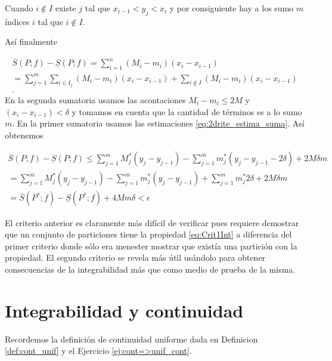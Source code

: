 \begin{demo}
Cuando  $i\notin I $  existe $j$ tal que $x_{i-1}<y_j<x_i$ y por consiguiente hay a los sumo $m$ índices $i$ tal que   $i\notin I $. 

Así finalmente

\begin{multline*}\label{eq:crite2_cuentas}
 \overline{S}(P;f)-\underline{S}(P;f)=\sum_{i=1}^n(M_i-m_i)(x_i-x_{i-1})\\
 =\sum_{j=1}^m \sum_{i\in I_j}(M_i-m_i)(x_i-x_{i-1})+ \sum_{i\notin I}(M_i-m_i)(x_i-x_{i-1})\\  .
\end{multline*}
En la segunda sumatoria usamos las acontaciones $M_i-m_i\leq 2M$ y $(x_i-x_{i-1})<\delta$ y tomamos en cuenta que la cantidad de términos es a lo sumo $m$. En la primer sumatoria usamos las estimaciones \eqref{eq:2drite_estima_suma}. Así obtenemos

\begin{multline*}
 \overline{S}(P;f)-\underline{S}(P;f)
 \leq \sum_{j=1}^m  M^*_j(y_j-y_{j-1})-\sum_{j=1}^m  m^*_j(y_j-y_{j-1}-2\delta)+ 2M\delta m
 \\
 =\sum_{j=1}^m  M^*_j(y_j-y_{j-1})-\sum_{j=1}^m  m^*_j(y_j-y_{j-1})+ \sum_{j=1}^m m^*_j 2\delta +2M\delta m
 \\ 
 = \overline{S}(P^*;f)-\underline{S}(P^*;f)+4Mm\delta<\epsilon
\end{multline*}
 
\end{demo}


\begin{observa} El criterio anterior es claramente más difícil de verificar pues requiere demostrar que un conjunto de particiones tiene la propiedad  \eqref{eq:Crit1Int} a diferencia del primer criterio donde sólo era menester mostrar que existía una partición con la propiedad. El segundo criterio se revela más útil usándolo para obtener consecuencias de la integrabilidad más que como medio de prueba de la misma. 
 
\end{observa}



\section{Integrabilidad y continuidad}

Recordemos la definición de continuidad uniforme dada en Definicion \ref{def:cont_unif} y  el Ejercicio \ref{ej:cont=>unif_cont}.
 
